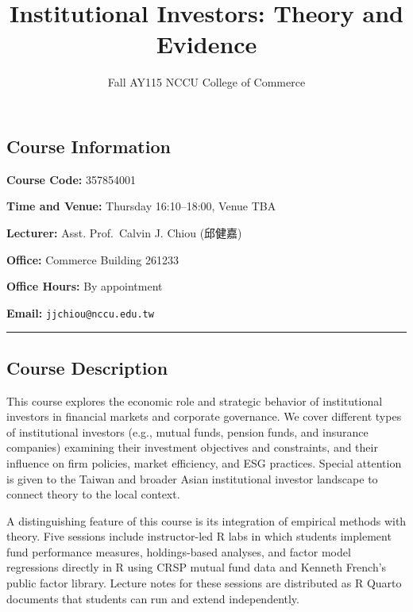 \documentclass[
  12pt,
  letterpaper,
  DIV=11,
  numbers=noendperiod]{scrartcl}
\title{Institutional Investors: Theory and Evidence}
\subtitle{Fall AY115 \textbar{} NCCU College of Commerce}
\author{}
\date{}
\renewcommand*\contentsname{Table of contents}
\newcommand\contentsname{Table of contents}
\begin{document}
\maketitle

\renewcommand*\contentsname{Table of contents}
{
\setcounter{tocdepth}{2}
\tableofcontents
}

\subsection{Course Information}\label{course-information}

\textbf{Course Code:} 357854001

\textbf{Time and Venue:} Thursday 16:10--18:00, Venue TBA

\textbf{Lecturer:} Asst. Prof.~Calvin J. Chiou (邱健嘉)

\textbf{Office:} Commerce Building 261233

\textbf{Office Hours:} By appointment

\textbf{Email:} \texttt{jjchiou@nccu.edu.tw}

\begin{center}\rule{0.5\linewidth}{0.5pt}\end{center}

\subsection{Course Description}\label{course-description}

This course explores the economic role and strategic behavior of
institutional investors in financial markets and corporate governance.
We cover different types of institutional investors (e.g., mutual funds,
pension funds, and insurance companies) examining their investment
objectives and constraints, and their influence on firm policies, market
efficiency, and ESG practices. Special attention is given to the Taiwan
and broader Asian institutional investor landscape to connect theory to
the local context.

A distinguishing feature of this course is its integration of empirical
methods with theory. Five sessions include instructor-led R labs in
which students implement fund performance measures, holdings-based
analyses, and factor model regressions directly in R using CRSP mutual
fund data and Kenneth French's public factor library. Lecture notes for
these sessions are distributed as R Quarto documents that students can
run and extend independently.
\end{document}
